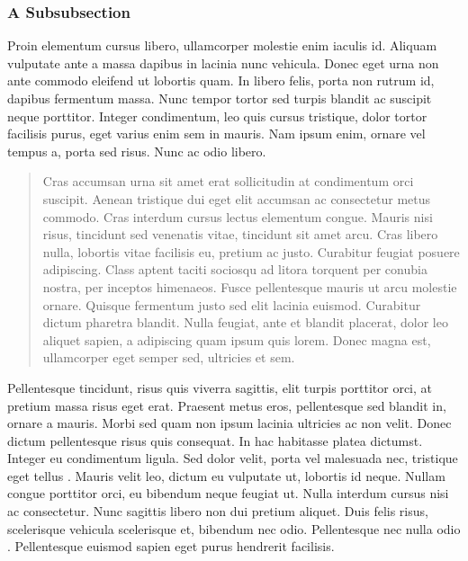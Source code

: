 \subsubsection{A Subsubsection}
Proin elementum cursus libero, ullamcorper molestie enim iaculis id. Aliquam vulputate ante a massa dapibus in lacinia nunc vehicula. Donec eget urna non ante commodo eleifend ut lobortis quam. In libero felis, porta non rutrum id, dapibus fermentum massa. Nunc tempor tortor sed turpis blandit ac suscipit neque porttitor. Integer condimentum, leo quis cursus tristique, dolor tortor facilisis purus, eget varius enim sem in mauris. Nam ipsum enim, ornare vel tempus a, porta sed risus. Nunc ac odio libero. 
\begin{quote}
Cras accumsan urna sit amet erat sollicitudin at condimentum orci suscipit. Aenean tristique dui eget elit accumsan ac consectetur metus commodo. Cras interdum cursus lectus elementum congue. Mauris nisi risus, tincidunt sed venenatis vitae, tincidunt sit amet arcu. Cras libero nulla, lobortis vitae facilisis eu, pretium ac justo. Curabitur feugiat posuere adipiscing. Class aptent taciti sociosqu ad litora torquent per conubia nostra, per inceptos himenaeos. Fusce pellentesque mauris ut arcu molestie ornare. Quisque fermentum justo sed elit lacinia euismod. Curabitur dictum pharetra blandit. Nulla feugiat, ante et blandit placerat, dolor leo aliquet sapien, a adipiscing quam ipsum quis lorem. Donec magna est, ullamcorper eget semper sed, ultricies et sem. 
\end{quote}

Pellentesque tincidunt, risus quis viverra sagittis, elit turpis porttitor orci, at pretium massa risus eget erat. Praesent metus eros, pellentesque sed blandit in, ornare a mauris. Morbi sed quam non ipsum lacinia ultricies ac non velit. Donec dictum pellentesque risus quis consequat. In hac habitasse platea dictumst. Integer eu condimentum ligula. Sed dolor velit, porta vel malesuada nec, tristique eget tellus \cite{madden2002tta}. Mauris velit leo, dictum eu vulputate ut, lobortis id neque. Nullam congue porttitor orci, eu bibendum neque feugiat ut. Nulla interdum cursus nisi ac consectetur. Nunc sagittis libero non dui pretium aliquet. Duis felis risus, scelerisque vehicula scelerisque et, bibendum nec odio. Pellentesque nec nulla odio \cite{madden2005taq}. Pellentesque euismod sapien eget purus hendrerit facilisis. 

